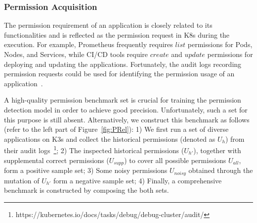 \documentclass[conference]{IEEEtran}
\theoremstyle{definition}
\begin{document}

\subsubsection{Permission Acquisition}
\label{sec:permission_acquisition}

The permission requirement of an application is closely related to its functionalities and is reflected as the permission request in K8s during the execution. For example, Prometheus frequently requires $list$ permissions for Pods, Nodes, and Services, while CI/CD tools require $create$ and $update$ permissions for deploying and updating the applications. Fortunately, the audit logs recording permission requests could be used for identifying the permission usage of an application~\cite{wei2024log}. 


A high-quality permission benchmark set is crucial for training the permission detection model in order to achieve good precision. Unfortunately, such a set for this purpose is still absent. Alternatively, we construct this benchmark as follows (refer to the left part of Figure~\ref{fig:PRel}): 1) We first run a set of diverse applications on K3s and collect the historical permissions (denoted as $U_h$) from their audit logs~\footnote{https://kubernetes.io/docs/tasks/debug/debug-cluster/audit/}; 2) The inspected historical permissions ($U_{h'}$), together with supplemental correct permissions ($U_{supp}$) to cover all possible permissions $U_{all}$, form a positive sample set; 3) Some noisy permissions $U_{noisy}$ obtained through the mutation of $U_{h'}$ form a negative sample set; 4) Finally, a comprehensive benchmark is constructed by composing the both sets.    

\end{document}
